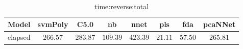 \begin{table}[!ht]
	\centering
	\begin{tabular}{|c|c|c|c|c|c|c|c|}
		\hline
		Model & svmPoly & C5.0 & nb & nnet & pls & fda & pcaNNet \\ \hline
		elapsed & $266.57$ & $283.87$ & $109.39$ & $423.39$ & $21.11$ & $57.50$ & $265.81$ \\ \hline
	\end{tabular}
	\caption{time:reverse:total}
	\label{tab:time:reverse:total}
\end{table}
